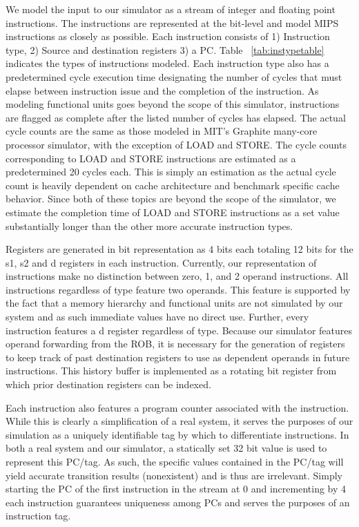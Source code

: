 We model the input to our simulator as a stream of integer and floating point instructions.  The instructions are represented at the bit-level and model MIPS instructions as closely as possible.  Each instruction consists of 1) Instruction type, 2) Source and destination registers 3) a PC.  Table ~\ref{tab:instypetable} indicates the types of instructions modeled.  Each instruction type also has a predetermined cycle execution time designating the number of cycles that must elapse between instruction issue and the completion of the instruction.  As modeling functional units goes beyond the scope of this simulator, instructions are flagged as complete after the listed number of cycles has elapsed.  The actual cycle counts are the same as those modeled in MIT's Graphite many-core processor simulator\cite{graphite}, with the exception of LOAD and STORE.  The cycle counts corresponding to LOAD and STORE instructions are estimated as a predetermined 20 cycles each.  This is simply an estimation as the actual cycle count is heavily dependent on cache architecture and benchmark specific cache behavior.  Since both of these topics are beyond the scope of the simulator, we estimate the completion time of LOAD and STORE instructions as a set value substantially longer than the other more accurate instruction types.

Registers are generated in bit representation as 4 bits each totaling 12 bits for the s1, s2 and d registers in each instruction. Currently, our representation of instructions make no distinction between zero, 1, and 2 operand instructions.  All instructions regardless of type feature two operands.  This feature is supported by the fact that a memory hierarchy and functional units are not simulated by our system and as such immediate values have no direct use.  Further, every instruction features a d register regardless of type.  Because our simulator features operand forwarding from the ROB, it is necessary for the generation of registers to keep track of past destination registers to use as dependent operands in future instructions.  This history buffer is implemented as a rotating bit register from which prior destination registers can be indexed.

Each instruction also features a program counter associated with the instruction.  While this is clearly a simplification of a real system, it serves the purposes of our simulation as a uniquely identifiable tag by which to differentiate instructions.  In both a real system and our simulator, a statically set 32 bit value is used to represent this PC/tag.  As such, the specific values contained in the PC/tag will yield accurate transition results (nonexistent) and is thus are irrelevant.  Simply starting the PC of the first instruction in the stream at 0 and incrementing by 4 each instruction guarantees uniqueness among PCs and serves the purposes of an instruction tag.

